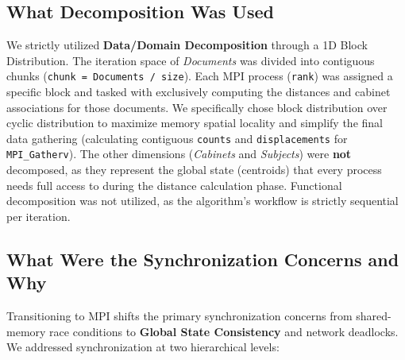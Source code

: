 \documentclass[12pt,a4paper]{article}
\begin{document}
\subsection{What Decomposition Was Used}
We strictly utilized \textbf{Data/Domain Decomposition} through a 1D Block Distribution. 
The iteration space of \textit{Documents} was divided into contiguous chunks (\texttt{chunk = Documents / size}). Each MPI process (\texttt{rank}) was assigned a specific block and tasked with exclusively computing the distances and cabinet associations for those documents. 
We specifically chose block distribution over cyclic distribution to maximize memory spatial locality and simplify the final data gathering (calculating contiguous \texttt{counts} and \texttt{displacements} for \texttt{MPI\_Gatherv}). The other dimensions (\textit{Cabinets} and \textit{Subjects}) were \textbf{not} decomposed, as they represent the global state (centroids) that every process needs full access to during the distance calculation phase. Functional decomposition was not utilized, as the algorithm's workflow is strictly sequential per iteration.

\subsection{What Were the Synchronization Concerns and Why}
Transitioning to MPI shifts the primary synchronization concerns from shared-memory race conditions to \textbf{Global State Consistency} and network deadlocks. We addressed synchronization at two hierarchical levels:
\end{document}
